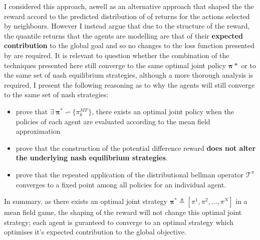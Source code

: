 I considered this approach, aswell as an alternative approach that shaped the the reward accord to the
predicted distribution of of returns for the actions selected by neighbours. However I instead argue that
due to the structure of the reward, the quantile returns that the agents are modelling are that of their
\textbf{expected contribution} to the global goal and so no changes to the loss function
presented by \cite{Sriram2020} are required. It is relevant to question whether the combination
of the techniques presented here still converge to the same optimal joint policy $\mathbf{\pi}*$ or 
to the same set of nash equilibrium strategies, although a more thorough analysis is required,
I present the following reasoning as to why the agents will still converge to the same set of
nash strategies:
\begin{itemize}
    \item \cite{Yang2018} prove that $\exists \: \boldsymbol \pi^* \backsim \{\pi_k^{MF}\}$, there exists
        an optimal joint policy when the policies of each agent are evaluated according to the
        mean field approximation
    \item \cite{Devlin2014} prove that the construction of the potential difference reward \textbf{does not
    alter the underlying nash equilibrium strategies}.
    \item \cite{Dabney2017} prove that the repeated application of the distributional bellman operator 
    $\mathcal{T}^\pi$ converges to a fixed point among all policies for an individual agent.
\end{itemize}
In summary, as there exists an optimal joint strategy $\boldsymbol \pi^*  \triangleq [\pi^1, \pi^2, \hdots, \pi^N]$ in a mean field game,
the shaping of the reward will not change this optimal joint strategy; each agent is guranteed to converge to
an optimal strategy which optimises it's expected contribution to the global objective.
